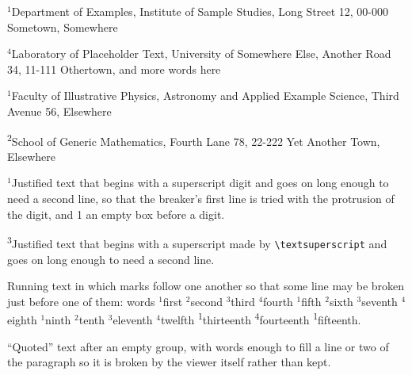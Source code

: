 \documentclass{article}
\begin{document}
{\small\raggedright $^1$Department of Examples, Institute of Sample Studies, Long Street 12, 00-000 Sometown, Somewhere\par}
{\small\raggedright $^4$Laboratory of Placeholder Text, University of Somewhere Else, Another Road 34, 11-111 Othertown, and more words here\par}
{\raggedright $^{1}$Faculty of Illustrative Physics, Astronomy and Applied Example Science, Third Avenue 56, Elsewhere\par}
{\raggedright \textsuperscript{2}School of Generic Mathematics, Fourth Lane 78, 22-222 Yet Another Town, Elsewhere\par}

\noindent $^1$Justified text that begins with a superscript digit and goes on long enough to need a second line, so that the
breaker's first line is tried with the protrusion of the digit, and
\mbox{}1 an empty box before a digit.

\noindent\textsuperscript{3}Justified text that begins with a superscript made by \verb|\textsuperscript| and
goes on long enough to need a second line.

Running text in which marks follow one another so that some line may be broken just before one of them:
words $^1$first $^2$second $^3$third $^4$fourth $^1$fifth $^2$sixth $^3$seventh $^4$eighth $^1$ninth $^2$tenth
$^3$eleventh $^4$twelfth \textsuperscript{1}thirteenth \textsuperscript{4}fourteenth \textsuperscript{1}fifteenth.

{}``Quoted'' text after an empty group, with words enough to fill a line or two of the paragraph so it is broken by the
viewer itself rather than kept.
\end{document}
